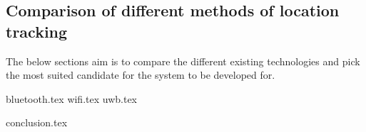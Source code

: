 \subsection{Comparison of different methods of location tracking}
The below sections aim is to compare the different existing technologies and pick the most suited candidate for the system to be developed for. 

{bluetooth.tex}
{wifi.tex}
{uwb.tex}

{conclusion.tex}
